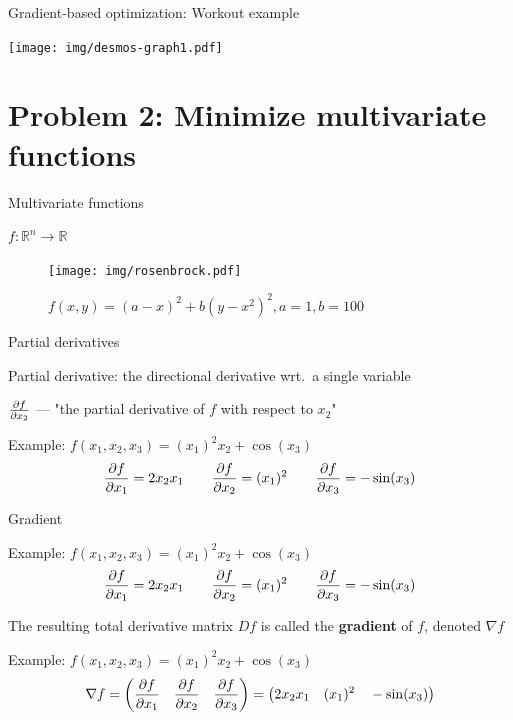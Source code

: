 \documentclass[12pt,aspectratio=169,handout]{beamer}
\begin{document}
\begin{frame}{Gradient-based optimization: Workout example}
	
	\texttt{[image: img/desmos-graph1.pdf]}
	
	
\end{frame}


\section{Problem 2: Minimize multivariate functions}


\begin{frame}{Multivariate functions}
	
	$f: \mathbb{R}^n \to \mathbb{R}$
	
	\pause
	
	\begin{figure}
		\centering
		\texttt{[image: img/rosenbrock.pdf]}
		\caption{$f(x,y)=(a-x)^{2}+b(y-x^{2})^{2}, a = 1, b = 100$}
	\end{figure}
\end{frame}




\begin{frame}{Partial derivatives}
	
	Partial derivative: the directional derivative wrt.\ a single variable
	
	\bigskip
	
	$\pdv{f}{x_2}$ --- "the partial derivative of $f$ with respect to $x_2$"
	
	\bigskip
	
	\begin{block}{Example: $f(x_1, x_2, x_3) = (x_1)^2 x_2 + \cos(x_3)$}
		$$
		\pdv{f}{x_1} = 2 x_2 x_1 \qquad \pdv{f}{x_2} = (x_1)^2 \qquad \pdv{f}{x_3} = - \sin (x_3)
		$$
	\end{block}
	
	
\end{frame}


\begin{frame}{Gradient}
	
	\begin{block}{Example: $f(x_1, x_2, x_3) = (x_1)^2 x_2 + \cos(x_3)$}
		$$
		\pdv{f}{x_1} = 2 x_2 x_1 \qquad \pdv{f}{x_2} = (x_1)^2 \qquad \pdv{f}{x_3} = - \sin (x_3)
		$$
	\end{block}
	
	
	The resulting total derivative matrix $Df$ is called the \textbf{gradient} of $f$, denoted $\nabla f$
	
	\begin{block}{Example: $f(x_1, x_2, x_3) = (x_1)^2 x_2 + \cos(x_3)$}
		$$
		\nabla f = \left( \pdv{f}{x_1} \quad \pdv{f}{x_2} \quad \pdv{f}{x_3} \right) = 
		\left(
		2 x_2 x_1  \quad (x_1)^2  \quad - \sin (x_3)
		\right)
		$$
	\end{block}
	
	
\end{frame}
\end{document}
